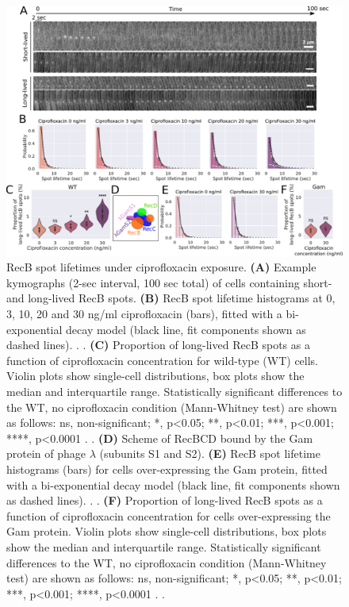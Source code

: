 \begin{figure}[htbp]
    \centering
    \includegraphics[width=.9\textwidth]{Figures/Fig2_RecB_lifetime.pdf}
    \caption{RecB spot lifetimes under ciprofloxacin exposure. \textbf{(A)} Example kymographs (2-sec interval, 100 sec total) of cells containing short- and long-lived RecB spots. \textbf{(B)} RecB spot lifetime histograms at 0, 3, 10, 20 and 30 ng/ml ciprofloxacin (bars), fitted with a bi-exponential decay model (black line, fit components shown as dashed lines). . . \textbf{(C)} Proportion of long-lived RecB spots as a function of ciprofloxacin concentration for wild-type (WT) cells. Violin plots show single-cell distributions, box plots show the median and interquartile range. Statistically significant differences to the WT, no ciprofloxacin condition (Mann-Whitney test) are shown as follows: ns, non-significant; *, p<0.05; **, p<0.01; ***, p<0.001; ****, p<0.0001 . . \textbf{(D)} Scheme of RecBCD bound by the Gam protein of phage $\lambda$ (subunits S1 and S2). \textbf{(E)} RecB spot lifetime histograms (bars) for cells over-expressing the Gam protein, fitted with a bi-exponential decay model (black line, fit components shown as dashed lines). . . \textbf{(F)} Proportion of long-lived RecB spots as a function of ciprofloxacin concentration for cells over-expressing the Gam protein. Violin plots show single-cell distributions, box plots show the median and interquartile range. Statistically significant differences to the WT, no ciprofloxacin condition (Mann-Whitney test) are shown as follows: ns, non-significant; *, p<0.05; **, p<0.01; ***, p<0.001; ****, p<0.0001 . .}
    \label{Fig:lifetimes}
\end{figure}

